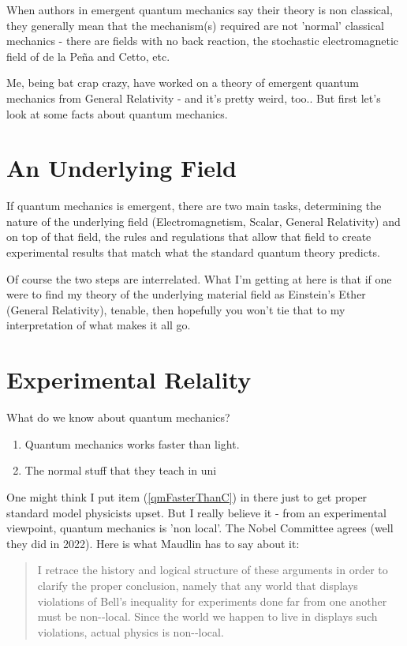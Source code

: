 \documentclass[../rzero]{subfiles}
\begin{document}
When authors in emergent quantum mechanics say their theory is non classical, they generally mean that the mechanism(s) required are not 'normal' classical mechanics - there are fields with no back reaction, the stochastic electromagnetic field of de la Peña and Cetto, etc.

Me, being bat crap crazy, have worked on a theory of emergent quantum mechanics from General Relativity - and it's pretty weird, too.\cite{Andersen2016}. But first let's look at some facts about quantum mechanics.

\section{An Underlying Field}
If quantum mechanics is emergent, there are two main tasks, determining the nature of the underlying field (Electromagnetism, Scalar, General Relativity) and on top of that field, the rules and regulations that allow that field to create experimental results that match what the standard quantum theory predicts. 

Of course the two steps are interrelated. What I'm getting at here is that if one were to find my theory of the underlying material field as Einstein's Ether\cite{Einstein1920} (General Relativity), tenable, then hopefully you won't tie that to my interpretation of what makes it all go. 

\section{Experimental Relality}
What do we know about quantum mechanics?

\begin{enumerate}
	\item{Quantum mechanics works faster than light.}\label{qmFasterThanC}
	\item{The normal stuff that they teach in uni}
\end{enumerate}

One might think I put item (\ref{qmFasterThanC}) in there just to get proper standard model physicists upset. But I really believe it -  from an experimental viewpoint, quantum mechanics is 'non local'. The Nobel Committee agrees\cite{AllNobelPrizes} (well they did in 2022). Here is what Maudlin has to say about it\cite{Maudlind}:

\begin{quotation}
	I retrace the history and logical structure of these arguments in order to clarify the proper conclusion, namely that any world that displays violations of Bell’s inequality for experiments done far from one another must be non-­‐local. Since the world we happen to live in displays such violations, actual physics is non-­‐local.
\end{quotation}
\end{document}

